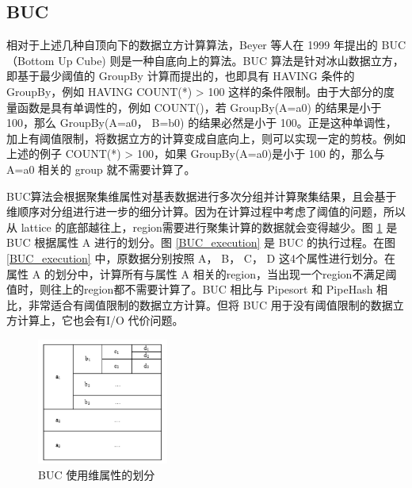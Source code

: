 
\subsection{BUC}

相对于上述几种自顶向下的数据立方计算算法，Beyer 等人在 1999 年提出的 BUC （Bottom Up Cube) 则是一种自底向上的算法。BUC 算法是针对冰山数据立方，即基于最少阈值的 GroupBy 计算而提出的，也即具有 HAVING 条件的 GroupBy，例如 HAVING COUNT(*) > 100 这样的条件限制。由于大部分的度量函数是具有单调性的，例如 COUNT()，若 GroupBy(A=a0) 的结果是小于 100，那么 GroupBy(A=a0， B=b0) 的结果必然是小于 100。正是这种单调性，加上有阈值限制，将数据立方的计算变成自底向上，则可以实现一定的剪枝。例如上述的例子 COUNT(*) > 100，如果 GroupBy(A=a0)是小于 100 的，那么与 A=a0 相关的 group 就不需要计算了。

BUC算法会根据聚集维属性对基表数据进行多次分组并计算聚集结果，且会基于维顺序对分组进行进一步的细分计算。因为在计算过程中考虑了阈值的问题，所以从 lattice 的底部越往上，region需要进行聚集计算的数据就会变得越少。图 \ref{BUC_partition} 是 BUC 根据属性 A 进行的划分。图 \ref{BUC_execution} 是 BUC 的执行过程。在图 \ref{BUC_execution} 中，原数据分别按照 A， B， C， D 这4个属性进行划分。在属性 A 的划分中，计算所有与属性 A 相关的region，当出现一个region不满足阈值时，则往上的region都不需要计算了。BUC 相比与 Pipesort 和 PipeHash 相比，非常适合有阈值限制的数据立方计算。但将 BUC 用于没有阈值限制的数据立方计算上，它也会有I/O 代价问题。

\begin{figure}[!htb]
\centering\includegraphics[width=1.7in]{picture/ch_current_research/BUC_partition} 
\caption{BUC 使用维属性的划分}\label{BUC_partition} 
\end{figure} 


